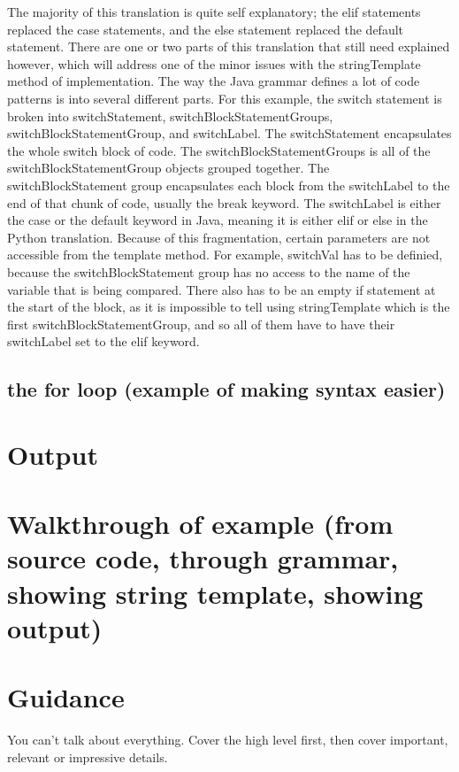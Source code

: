 \documentclass{l4proj}
\begin{document}
The majority of this translation is quite self explanatory; the elif statements replaced the case statements, and the else statement replaced the default statement. There are one or two parts of this translation that still need explained however, which will address one of the minor issues with the stringTemplate method of implementation.
The way the Java grammar defines a lot of code patterns is into several different parts. For this example, the switch statement is broken into switchStatement, switchBlockStatementGroups, switchBlockStatementGroup, and switchLabel. The switchStatement encapsulates the whole switch block of code. The switchBlockStatementGroups is all of the switchBlockStatementGroup objects grouped together. The switchBlockStatement group encapsulates each block from the switchLabel to the end of that chunk of code, usually the break keyword. The switchLabel is either the case or the default keyword in Java, meaning it is either elif or else in the Python translation. 
Because of this fragmentation, certain parameters are not accessible from the template method. For example, switchVal has to be definied, because the switchBlockStatement group has no access to the name of the variable that is being compared. There also has to be an empty if statement at the start of the block, as it is impossible to tell using stringTemplate which is the first switchBlockStatementGroup, and so all of them have to have their switchLabel set to the elif keyword.

\subsection{the for loop (example of making syntax easier)}

\section{Output}
\section{Walkthrough of example (from source code, through grammar, showing string template, showing output)}




\section{Guidance}
You can't talk about everything. Cover the high level first, then cover important, relevant or impressive details.
\end{document}
